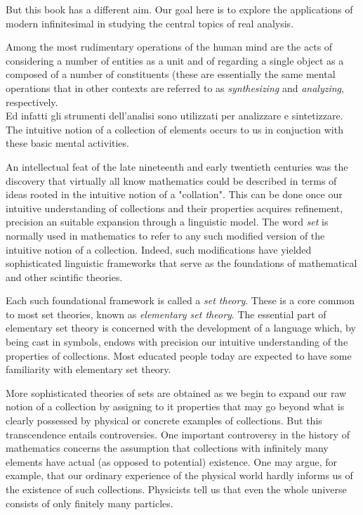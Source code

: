 But this book has a different aim. Our goal here is to explore the applications of modern infinitesimal in studying the central topics of real analysis.

Among the most rudimentary operations of the human mind are the acts of considering
a number of entities as a unit and 
of regarding a single object as a composed of a number of constituents 
(these are essentially the same mental operations that in other contexts are referred to as \emph{synthesizing} and \emph{analyzing}, respectively. \\
Ed infatti gli strumenti dell'analisi sono utilizzati per analizzare e sintetizzare. The intuitive notion of a collection of elements occurs to us in conjuction with these basic mental activities. 

An intellectual feat of the late nineteenth and early twentieth centuries was the discovery that virtually all know mathematics could be described in terms of ideas rooted in the intuitive notion of a "collation". This can be done once our intuitive understanding of collections and their properties acquires refinement, precision an suitable expansion through a linguistic model. The word \emph{set} is normally used in mathematics to refer to any such modified version of the intuitive notion of a collection. Indeed, such modifications have yielded sophisticated linguistic frameworks that serve as the foundations of mathematical and other scintific theories.

Each such foundational framework is called a \emph{set theory}. These is a core common to most set theories, known as \emph{elementary set theory}. The essential part of elementary set theory is concerned with the development of a language which, by being cast in symbols, endows with precision our intuitive understanding of the properties of collections. Most educated people today are expected to have some familiarity with elementary set theory.

More sophisticated theories of sets are obtained as we begin to expand our raw notion of a collection by assigning to it properties that may go beyond what is clearly possessed by physical or concrete examples of collections. But this transcendence entails controversies. One important controversy in the history of mathematics concerns the assumption that collections with infinitely many elements have actual (as opposed to potential) existence. One may argue, for example, that our ordinary experience of the physical world hardly informs us of the existence of such collections. Physicists tell us that even the whole universe consists of only finitely many particles.

